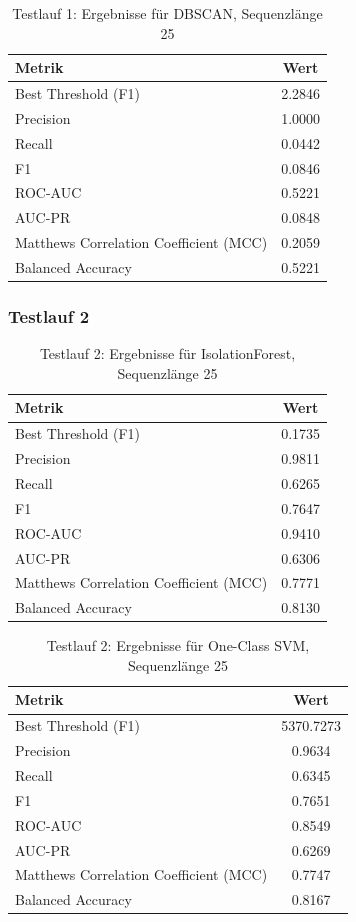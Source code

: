\documentclass[a4paper,12pt]{article}
\begin{document}
\begin{table}[H]
	\centering
	\begin{tabular}{l c}
		\hline
		Metrik & Wert \\
		\hline
		Best Threshold (F1) & 2.2846 \\
		Precision & 1.0000 \\
		Recall & 0.0442 \\
		F1 & 0.0846 \\
		ROC-AUC & 0.5221 \\
		AUC-PR & 0.0848 \\
		Matthews Correlation Coefficient (MCC) & 0.2059 \\
		Balanced Accuracy & 0.5221 \\
		\hline
	\end{tabular}
	\caption{Testlauf 1: Ergebnisse für DBSCAN, Sequenzlänge 25}
\end{table}

\subsubsection{Testlauf 2}

\begin{table}[H]
	\centering
	\begin{tabular}{l c}
		\hline
		Metrik & Wert \\
		\hline
		Best Threshold (F1) & 0.1735 \\
		Precision & 0.9811 \\
		Recall & 0.6265 \\
		F1 & 0.7647 \\
		ROC-AUC & 0.9410 \\
		AUC-PR & 0.6306 \\
		Matthews Correlation Coefficient (MCC) & 0.7771 \\
		Balanced Accuracy & 0.8130 \\
		\hline
	\end{tabular}
	\caption{Testlauf 2: Ergebnisse für IsolationForest, Sequenzlänge 25}
\end{table}

\begin{table}[H]
	\centering
	\begin{tabular}{l c}
		\hline
		Metrik & Wert \\
		\hline
		Best Threshold (F1) & 5370.7273 \\
		Precision & 0.9634 \\
		Recall & 0.6345 \\
		F1 & 0.7651 \\
		ROC-AUC & 0.8549 \\
		AUC-PR & 0.6269 \\
		Matthews Correlation Coefficient (MCC) & 0.7747 \\
		Balanced Accuracy & 0.8167 \\
		\hline
	\end{tabular}
	\caption{Testlauf 2: Ergebnisse für One-Class SVM, Sequenzlänge 25}
\end{table}
\end{document}
